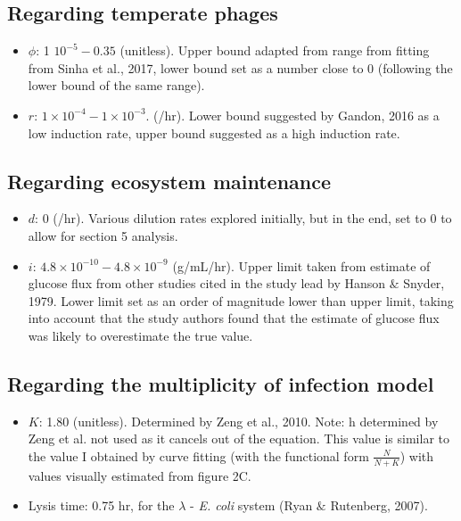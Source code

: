 \documentclass{article}
\begin{document}
\subsection{Regarding temperate phages}
\begin{itemize}
\item $\phi$: 1 \times $10^{-5} - 0.35$ (unitless). Upper bound adapted from range from fitting from Sinha et al., 2017, lower bound set as a number close to 0 (following the lower bound of the same range). 

\item $r$: $1 \times 10^{-4} - 1 \times 10^{-3}$. (/hr). Lower bound suggested by Gandon, 2016 as a low induction rate, upper bound suggested as a high induction rate. 
\end{itemize}

\subsection{Regarding ecosystem maintenance}
\begin{itemize}
\item $d$: 0 (/hr). Various dilution rates explored initially, but in the end, set to 0 to allow for section 5 analysis.

\item $i$: $4.8 \times 10^{-10} - 4.8 \times 10^{-9}$ (g/mL/hr). Upper limit taken from estimate of glucose flux from other studies cited in the study lead by Hanson $\&$ Snyder, 1979. Lower limit set as an order of magnitude lower than upper limit, taking into account that the study authors found that the estimate of glucose flux was likely to overestimate the true value.
\end{itemize}

\subsection{Regarding the multiplicity of infection model}
\begin{itemize}
\item $K$: 1.80 (unitless). Determined by Zeng et al., 2010. Note: h determined by Zeng et al. not used as it cancels out of the equation. This value is similar to the value I obtained by curve fitting (with the functional form $\frac{N}{N+K}$) with values visually estimated from figure 2C. 

\item Lysis time: 0.75 hr, for the $\lambda$ - \textit{E. coli} system (Ryan $\&$ Rutenberg, 2007). 
\end{itemize}
\end{document}
